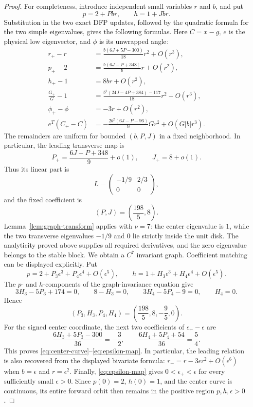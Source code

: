 \documentclass[smallextended,envcountsame]{svjour3}
\begin{document}
\begin{proof}
For completeness, introduce independent small variables $r$ and $b$, and put
\[
p=2+Pb r,\qquad h=1+Jb r.
\]
Substitution in the two exact DFP updates, followed by the quadratic formula
for the two simple eigenvalues, gives the following formulas.  Here
$C=x-g$, $e$ is the physical low eigenvector, and $\phi$ is its unwrapped
angle:
\begin{align*}
r_+-r
 &=\frac{b(6J+5P-300)}{18}r^2+O(r^3),\\
p_+-2
 &=\frac{b(6J-P+348)}9r+O(r^2),\\
h_+-1&=8br+O(r^2),\\
\frac{G_+}{G}-1
 &=\frac{b^2(24J-4P+384)-117}{18}r^2+O(r^3),\\
\phi_+-\phi&=-3r+O(r^2),\\
e^T(C_+-C)
 &=-\frac{2b^2(6J-P+96)}9Gr^2+O(G|b|r^3).
\end{align*}
The remainders are uniform for bounded $(b,P,J)$ in a fixed neighborhood.
In particular, the leading transverse map is
\begin{equation}\label{eq:transverse-map}
P_+=\frac{6J-P+348}{9}+o(1),
\qquad J_+=8+o(1).
\end{equation}
Thus its linear part is
\[
L=\begin{pmatrix}-1/9&2/3\\0&0\end{pmatrix},
\]
and the fixed coefficient is
\[
(P,J)=\left(\frac{198}{5},8\right).
\]
Lemma~\ref{lem:graph-transform} applies with $\nu=7$: the center eigenvalue is
$1$, while the two transverse eigenvalues $-1/9$ and $0$ lie strictly inside
the unit disk.  The analyticity proved above supplies all required
derivatives, and the zero eigenvalue belongs to the stable block.  We obtain a
$C^7$ invariant graph.  Coefficient matching can be displayed explicitly.
Put
\[
p=2+P_3\epsilon^3+P_4\epsilon^4+O(\epsilon^5),
\qquad
h=1+H_3\epsilon^3+H_4\epsilon^4+O(\epsilon^5).
\]
The $p$- and $h$-components of the graph-invariance equation give
\begin{equation}\label{eq:graph-coefficient-system}
3H_3-5P_3+174=0,\qquad 8-H_3=0,\qquad
3H_4-5P_4-9=0,\qquad H_4=0.
\end{equation}
Hence
\[
(P_3,H_3,P_4,H_4)=\left(\frac{198}{5},8,-\frac95,0\right).
\]
For the signed center coordinate, the next two coefficients of
$\epsilon_+-\epsilon$ are
\[
\frac{6H_3+5P_3-300}{36}=-\frac32,
\qquad
\frac{6H_4+5P_4+54}{36}=\frac54.
\]
This proves \eqref{eq:center-curve}--\eqref{eq:epsilon-map}.  In particular,
the leading relation is also recovered from the displayed bivariate formula:
$r_+=r-3\epsilon r^2+O(\epsilon^6)$ when
$b=\epsilon$ and $r=\epsilon^2$.
Finally, \eqref{eq:epsilon-map} gives
$0<\epsilon_+<\epsilon$ for every sufficiently small $\epsilon>0$.
Since $p(0)=2$, $h(0)=1$, and the center curve is continuous, its entire
forward orbit then remains in the positive region $p,h,\epsilon>0$.
\end{proof}
\end{document}
